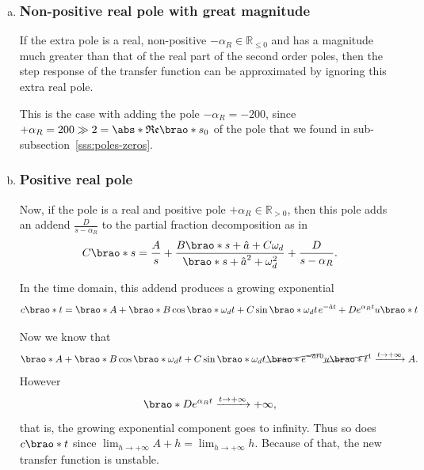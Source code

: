 \documentclass[12pt]{article}
\DeclarePairedDelimiter\brao()%
\DeclarePairedDelimiter\abs||
\begin{document}
\begin{enumerate}[(a)]
    \item
        \subsubsection{Non-positive real pole with great magnitude}

        If the extra pole is a real, non-positive $-\alpha_{{R}} \in \mathbb{R}_{\leq 0}$ and has a magnitude much greater than that of the real part of the second order poles,
        then the step response of the transfer function can be approximated by ignoring this extra real pole.

        This is the case with adding the pole $-\alpha_R = -200$, since $+\alpha_R = 200 \gg 2 = \abs*{\mathfrak{Re}\brao*{s_0}}$ of the pole that we found in sub-subsection~\ref{sss:poles-zeros}.

    \item
        \subsubsection{Positive real pole}

        Now, if the pole is a real and positive pole $+\alpha_R \in \mathbb{R}_{> 0}$, then this pole adds an addend $\frac{D}{s - \alpha_R}$ to the partial fraction decomposition as in
        \begin{equation}
            C\brao*s = \frac{A}s + \frac{B\brao*{s + \hat{a}}+ C\omega_d}{\brao*{s + \hat{a}}^2 + \omega_d^2} + \frac{D}{s - \alpha_R}.
        \end{equation}

        In the time domain, this addend produces a growing exponential
        \begin{equation}
            c\brao*t = \brao*{
                A + \brao*{
                      B\cos\brao*{\omega_d t}
                    + C\sin\brao*{\omega_d t}^{\vphantom{1}}
                }^{\vphantom{1}}
                e^{-\hat{a}t}
                + De^{\alpha_Rt}
            }u\brao*t
        \end{equation}

        Now we know that
        \begin{equation}
            \brao*{
                A + \brao*{
                      B\cos\brao*{\omega_d t}
                    + C\sin\brao*{\omega_d t}^{\vphantom{1}}
                }^{\vphantom{1}}
                \cancel{\brao*{e^{-\hat{a}t}}}^0
            }\cancel{u\brao*t}^1
            \xrightarrow{t\to+\infty} A.
        \end{equation}
        However
        \begin{equation}
            \brao*{
                De^{\alpha_Rt}
            }
            \xrightarrow{t\to+\infty} +\infty,
        \end{equation}
        that is, the growing exponential component goes to infinity. Thus so does $c\brao*t$ since $\lim_{h\to+\infty} A + h = \lim_{h\to+\infty} h$.
        Because of that, the new transfer function is unstable.
\end{enumerate}
\end{document}
